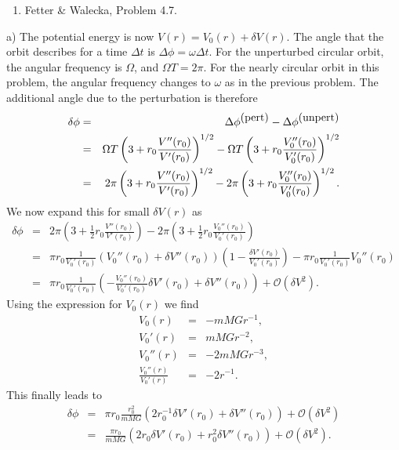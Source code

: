 \documentclass[letterpaper,11pt]{article}
\begin{document}
\begin{enumerate}[resume]
 \item Fetter \& Walecka, Problem 4.7.
\end{enumerate}
a) The potential energy is now $V(r) = V_0(r) + \delta V(r)$.  The angle that the orbit describes for a time $\Delta t$ is $\Delta\phi = \omega \Delta t$.  For the unperturbed circular orbit, the angular frequency is $\Omega$, and $\Omega T = 2\pi$.  For the nearly circular orbit in this problem, the angular frequency changes to $\omega$ as in the previous problem.  The additional angle due to the perturbation is therefore
\begin{eqnarray*}
 \delta\phi & = & \Delta\phi^{\hbox{(pert)}} - \Delta\phi^{\hbox{(unpert)}} \\
 & = & \Omega T \left(3 + r_0 \frac{V''(r_0)}{V'(r_0)}\right)^{1/2} - \Omega T \left(3 + r_0 \frac{V_0''(r_0)}{V_0'(r_0)}\right)^{1/2} \\
 & = & 2\pi \left(3 + r_0 \frac{V''(r_0)}{V'(r_0)}\right)^{1/2} - 2\pi \left(3 + r_0 \frac{V_0''(r_0)}{V_0'(r_0)}\right)^{1/2}.
\end{eqnarray*}
We now expand this for small $\delta V(r)$ as
\begin{eqnarray*}
 \delta\phi & = & 2\pi \left(3 + \frac{1}{2} r_0 \frac{V''(r_0)}{V'(r_0)}\right) - 2\pi \left(3 + \frac{1}{2} r_0 \frac{V_0''(r_0)}{V_0'(r_0)}\right) \\
 & = & \pi r_0 \frac{1}{V_0'(r_0)} \left(V_0''(r_0) + \delta V''(r_0)\right) \left(1 - \frac{\delta V'(r_0)}{V_0'(r_0)}\right) - \pi r_0 \frac{1}{V_0'(r_0)} V_0''(r_0) \\
 & = & \pi r_0 \frac{1}{V_0'(r_0)} \left( - \frac{V_0''(r_0)}{V_0'(r_0)} \delta V'(r_0) + \delta V''(r_0)\right) + \mathcal{O}(\delta V^2).
\end{eqnarray*}
Using the expression for $V_0(r)$ we find
\begin{eqnarray*}
 V_0(r) & = & -mMGr^{-1}, \\
 V_0'(r) & = & mMGr^{-2}, \\
 V_0''(r) & = & -2mMGr^{-3}, \\
 \frac{V_0''(r)}{V_0'(r)} & = & -2 r^{-1}.
\end{eqnarray*}
This finally leads to
\begin{eqnarray*}
 \delta\phi & = & \pi r_0 \frac{r_0^2}{mMG} \left( 2 r_0^{-1} \delta V'(r_0) + \delta V''(r_0)\right) + \mathcal{O}(\delta V^2) \\
 & = & \frac{\pi r_0}{mMG} \left( 2 r_0 \delta V'(r_0) + r_0^2 \delta V''(r_0)\right) + \mathcal{O}(\delta V^2).
\end{eqnarray*}
\end{document}
